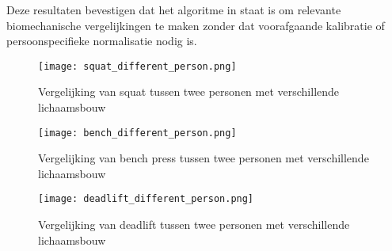 \medskip

Deze resultaten bevestigen dat het algoritme in staat is om relevante biomechanische vergelijkingen te maken zonder dat voorafgaande kalibratie of persoonspecifieke normalisatie nodig is.

\begin{figure}[h]
\centering
\texttt{[image: squat\_different\_person.png]}
\caption{Vergelijking van squat tussen twee personen met verschillende lichaamsbouw}
\label{fig:squat_diff_person}
\end{figure}

\begin{figure}[h]
\centering
\texttt{[image: bench\_different\_person.png]}
\caption{Vergelijking van bench press tussen twee personen met verschillende lichaamsbouw}
\label{fig:bench_diff_person}
\end{figure}

\begin{figure}[h]
\centering
\texttt{[image: deadlift\_different\_person.png]}
\caption{Vergelijking van deadlift tussen twee personen met verschillende lichaamsbouw}
\label{fig:deadlift_diff_person}
\end{figure}


